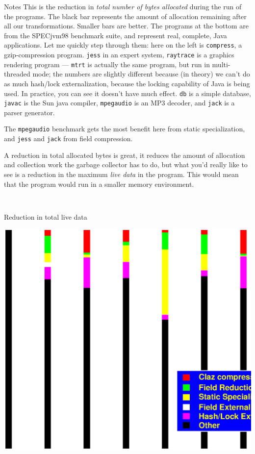 \documentclass[%
pdf,
colorBG,
slideColor,
nototal,
oqe
]{prosper}
\newenvironment{talknotes}{\begin{slide}{Notes}\tiny}{\end{slide}}
\begin{document}
\begin{talknotes}
This is the reduction in \emph{total number of bytes allocated} during
the run of the programs.  The black bar represents the amount of
allocation remaining after all our transformations.  Smaller bars are better.
The programs at the bottom are from the
SPECjvm98 benchmark suite, and represent real, complete, Java
applications.  Let me quickly step through them: here on the left is
{\tt compress}, a gzip-compression program.  {\tt jess} in an expert
system, {\tt raytrace} is a graphics rendering program --- {\tt mtrt}
is actually the same program, but run in multi-threaded mode; the
numbers are slightly different because (in theory) we can't do as much
hash/lock externalization, because the locking capability of Java is
being used.  In practice, you can see it doesn't have much effect.
{\tt db} is a simple database, {\tt javac} is the Sun java compiler,
{\tt mpegaudio} is an MP3 decoder, and {\tt jack} is a parser
generator.

The {\tt mpegaudio} benchmark gets the most benefit here from static
specialization, and {\tt jess} and {\tt jack} from field compression.

A reduction in total
allocated bytes is great, it reduces the amount of allocation and
collection work the
garbage collector has to do, but what you'd really like to see is a
reduction in the maximum \emph{live data} in the program.  This would
mean that the program would run in a smaller memory environment.

~%
\end{talknotes}

\begin{slide}{Reduction in total live data}
\begin{center}
\includegraphics[scale=0.45]{Figures/oopsla-ttllive-color.eps}
\end{center}
\end{slide}
\end{document}
